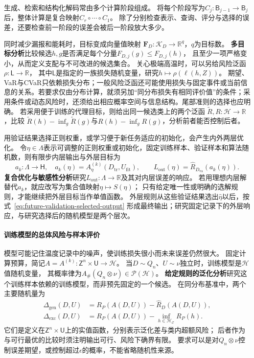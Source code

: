 生成、检索和结构化解码常由多个计算阶段组成。
将每个阶段写为$C_j:\mathsf B_{j-1}\to\mathsf B_j$后，整体计算是复合映射$C_r\circ\cdots\circ C_1$。
除了分别检查表示、查询、评分与选择的误差，还要检查前一阶段的误差会被后一阶段放大多少。

同时减少漏报和能耗时，目标变成向量值映射
$\bm F_D:\mathcal K_D\to\mathbb R^q$，$q$为目标数。
\textbf{多目标分析}比较候选$h,g$是否满足每个分量$F_{D,j}(g)\leq F_{D,j}(h)$，
且至少一项严格变小，从而定义支配与不可改进的候选集合。
关心极端高温时，可以另给风险泛函$\rho:\mathsf L\to\mathbb R$，
其中$\mathsf L$是指定的一族损失随机变量，研究$h\mapsto\rho(\ell(h,Z))$。
期望、VaR与CVaR只依赖损失分布；一般风险泛函还可能使用损失与固定事件或当前信息的关系。若要求仅由分布计算，就须另加“同分布损失有相同评价值”的条件；采用条件或动态风险时，还须给出相应概率空间与信息结构。尾部准则的选择也应明确。
若采用便于训练的代理目标，则给出同一候选类上的两个泛函
$\widetilde R,R:\mathcal H\to\mathbb R$，比较
$\widetilde R(h)-\inf_g\widetilde R(g)$与$R(h)-\inf_gR(g)$，分析前者能否控制后者。

用验证结果选择正则权重，或学习便于新任务适应的初始化，会产生内外两层优化。
令$\eta\in\Lambda$表示可调整的正则权重或初始化，固定训练样本、验证样本和算法随机数，则有限步内层输出与外层目标为
\[
  a_k:\Lambda\to\mathsf H,\quad a_k(\eta)=A_\eta^{(k)}(D_{\mathrm{tr}},U_{\mathrm{fit}}),
  \qquad L_{\mathrm{out}}(\eta)=\widehat R_{D_{\mathrm{va}}}(a_k(\eta)).
\]
\textbf{复合优化与敏感性分析}研究$L_{\mathrm{out}}:\Lambda\to\mathbb R$及其对内层误差的响应。
若用理想内层解替代$a_k$，就应改写为集合值映射$\eta\mapsto S(\eta)$；
只有给定唯一性或明确的选解规则，才能继续把外层目标当作单值函数。
外层规则从这些验证结果选出$\widehat\eta$以后，按式~\eqref{eq:future-validation-selected-output}
形成最终输出；研究固定记录下的外层响应，与研究选择后的随机模型是两个层次。

\paragraph{训练模型的总体风险与样本评价}
\label{sec:future-ml-generalization-evaluation}

模型可能记住温度记录中的噪声，使训练损失很小而未来误差仍然很大。
固定计算预算，简记$A=A^{(k)}:\mathsf Z^n\times\mathsf U\to\mathcal H$。
当$D\sim Q_n$、$U\sim\nu$独立时，训练模型是$\mathcal H$值随机变量，
其概率律为$A_{\#}(Q_n\otimes\nu)\in\mathcal P(\mathcal H)$。
\textbf{给定规则的泛化分析}研究这个训练样本依赖的训练模型，而非预先固定的一个候选。
在同分布基准中，两个主要随机量为
\[
  \begin{aligned}
    \Delta_{\mathrm{gen}}(D,U)
      &=R_P(A(D,U))-\widehat R_D(A(D,U)),\\
    \Delta_{\mathrm{exc}}(D,U)
      &=R_P(A(D,U))-\inf_{h\in\mathcal H_{\mathcal C}}R_P(h).
  \end{aligned}
\]
它们是定义在$\mathsf Z^n\times\mathsf U$上的实值函数，分别表示泛化差与类内超额风险；
后者作为与可行最优的比较时须注明输出可行、风险下确界有限。
要求可以是对$Q_n\otimes\nu$控制误差期望，或控制超过$\epsilon$的概率，不能省略随机性来源。

